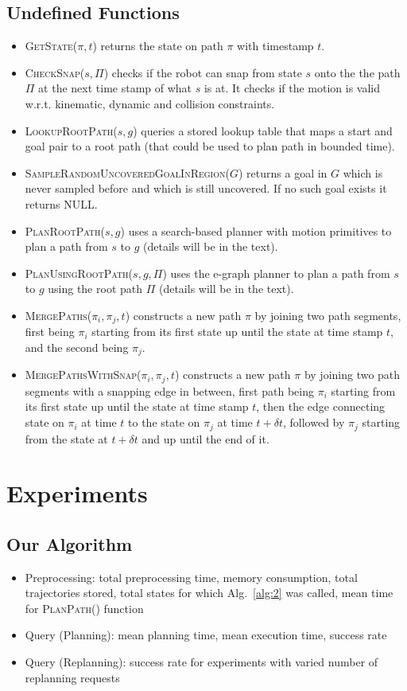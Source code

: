 \subsection*{Undefined Functions}
\begin{itemize}
  \item \textsc{GetState}($\pi,t$) returns the state on path $\pi$ with timestamp $t$.
  \item \textsc{CheckSnap}($s,\Pi$) checks if the robot can snap from state $s$ onto the the path $\Pi$ at the next time stamp of what $s$ is at. It checks if the motion is valid w.r.t. kinematic, dynamic and collision constraints.
  \item \textsc{LookupRootPath}($s,g$) queries a stored lookup table that maps a start and goal pair to a root path (that could be used to plan path in bounded time).
  \item \textsc{SampleRandomUncoveredGoalInRegion}($G$) returns a goal in $G$ which is never sampled before and which is still uncovered. If no such goal exists it returns NULL.
  \item \textsc{PlanRootPath}($s,g$) uses a search-based planner with motion primitives to plan a path from $s$ to $g$ (details will be in the text).
  \item \textsc{PlanUsingRootPath}($s,g,\Pi$) uses the e-graph planner to plan a path from $s$ to $g$ using the root path $\Pi$ (details will be in the text).
  \item \textsc{MergePaths}($\pi_i,\pi_j,t$) constructs a new path $\pi$ by joining two path segments, first being $\pi_i$ starting from its first state up until the state at time stamp $t$, and the second being $\pi_j$.
  \item \textsc{MergePathsWithSnap}($\pi_i,\pi_j,t$) constructs a new path $\pi$ by joining two path segments with a snapping edge in between, first path being $\pi_i$ starting from its first state up until the state at time stamp $t$, then the edge connecting state on $\pi_i$ at time $t$ to the state on $\pi_j$ at time $t + \delta t$, followed by $\pi_j$ starting from the state at $t + \delta t$ and up until the end of it.
\end{itemize}

\section{Experiments}
\subsection*{Our Algorithm}
\begin{itemize}
    \item Preprocessing: total preprocessing time, memory consumption, total trajectories stored, total states for which Alg.~\ref{alg:2} was called, mean time for \textsc{PlanPath}() function 
    \item Query (Planning): mean planning time, mean execution time, success rate 
    \item Query (Replanning): success rate for experiments with varied number of replanning requests

\end{itemize}
